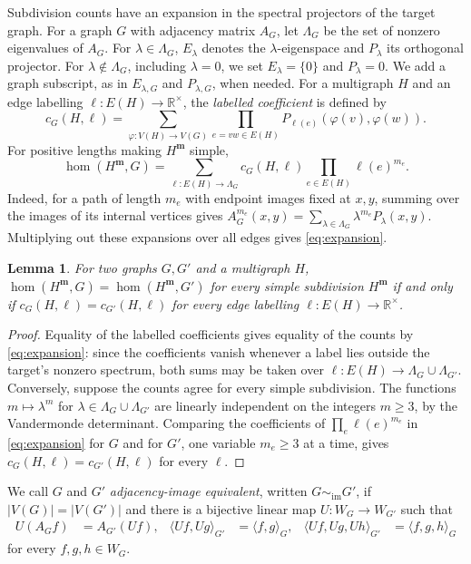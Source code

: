 \documentclass[11pt,a4paper]{article}
\theoremstyle{plain}
\newtheorem{lemma}[theorem]{Lemma}
\theoremstyle{definition}
\newcommand{\R}{\mathbb{R}}
\begin{document}
Subdivision counts have an expansion in the spectral projectors of the target graph.
For a graph $G$ with adjacency matrix $A_G$, let $\Lambda_G$ be the set of
nonzero eigenvalues of $A_G$.
For $\lambda\in\Lambda_G$, $E_\lambda$ denotes the
$\lambda$-eigenspace and $P_\lambda$ its orthogonal projector.
For $\lambda\notin\Lambda_G$, including $\lambda=0$, we set
$E_\lambda=\{0\}$ and $P_\lambda=0$.
We add a graph subscript, as in $E_{\lambda,G}$ and $P_{\lambda,G}$,
when needed. For a multigraph $H$ and an edge labelling
$\ell:E(H)\to\R^\times$, the \emph{labelled coefficient} is
defined by
\begin{equation}\label{eq:contraction}
 c_G(H,\ell)=\sum_{\varphi:V(H)\to V(G)}
    \prod_{e=vw\in E(H)}P_{\ell(e)}(\varphi(v),\varphi(w)).
\end{equation}
For positive lengths making $H^{\mathbf m}$ simple,
\begin{equation}\label{eq:expansion}
 \hom(H^{\mathbf m},G)=\sum_{\ell:E(H)\to\Lambda_G}
       c_G(H,\ell)\prod_{e\in E(H)}\ell(e)^{m_e}.
\end{equation}
Indeed, for a path of length $m_e$ with endpoint images fixed at $x,y$,
summing over the images of its internal vertices gives
$A_G^{m_e}(x,y)=\sum_{\lambda\in\Lambda_G}\lambda^{m_e}P_\lambda(x,y)$.
Multiplying out these expansions over all edges gives \cref{eq:expansion}.
\begin{lemma}\label{lem:subdivision-coefficients}
For two graphs $G,G'$ and a multigraph $H$,
$\hom(H^{\mathbf m},G)=\hom(H^{\mathbf m},G')$ for every simple
subdivision $H^{\mathbf m}$ if and only if $c_G(H,\ell)=c_{G'}(H,\ell)$
for every edge labelling $\ell:E(H)\to\R^\times$.
\end{lemma}
\begin{proof}
Equality of the labelled coefficients gives equality of the counts by
\cref{eq:expansion}: since the coefficients vanish whenever a label
lies outside the target's nonzero spectrum, both sums may be taken over
$\ell:E(H)\to\Lambda_G\cup\Lambda_{G'}$.
Conversely, suppose the counts agree for every simple subdivision.
The functions $m\mapsto\lambda^m$ for
$\lambda\in\Lambda_G\cup\Lambda_{G'}$ are linearly independent on the
integers $m\geq3$, by the Vandermonde determinant.
Comparing the coefficients of $\prod_e\ell(e)^{m_e}$ in
\cref{eq:expansion} for $G$ and for $G'$, one variable $m_e\geq3$ at a time,
gives
$c_G(H,\ell)=c_{G'}(H,\ell)$ for every $\ell$.
\end{proof}

We call $G$ and $G'$ \emph{adjacency-image equivalent}, written
$G\sim_{\mathrm{im}}G'$, if $|V(G)|=|V(G')|$ and
there is a bijective linear map $U:W_G\to W_{G'}$ such that
\begin{equation}\label{eq:adjacency-image-equivalence}
 \begin{aligned}
 U(A_Gf)&=A_{G'}(Uf), &
 \langle Uf,Ug\rangle_{G'}&=\langle f,g\rangle_G, &
 \langle Uf,Ug,Uh\rangle_{G'}&=\langle f,g,h\rangle_G
 \end{aligned}
\end{equation}
for every $f,g,h\in W_G$.
\end{document}
